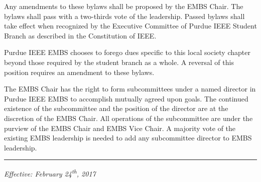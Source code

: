 \documentclass[12pt]{constitution}
\begin{document}
\label{art:amend}

Any amendments to these bylaws shall be proposed by the EMBS Chair. The bylaws shall pass with a two-thirds vote of the leadership. Passed bylaws shall take effect when recognized by the Executive Committee of Purdue IEEE Student Branch as described in the Constitution of IEEE.


\label{art:dues}

Purdue IEEE EMBS chooses to forego dues specific to this local society chapter beyond those required by the student branch as a whole. A reversal of this position requires an amendment to these bylaws.


\label{art:subcommittee}

The EMBS Chair has the right to form subcommittees under a named director in Purdue IEEE EMBS to accomplish mutually agreed upon goals. The continued existence of the subcommittee and the position of the director are at the discretion of the EMBS Chair. All operations of the subcommittee are under the purview of the EMBS Chair and EMBS Vice Chair. A majority vote of the existing EMBS leadership is needed to add any subcommittee director to EMBS leadership.



\vspace{12pt}
\hrule

\textit{Effective: February 24\textsuperscript{th}, 2017}


\setcounter{tocdepth}{1}
\listoftodos %
\end{document}
